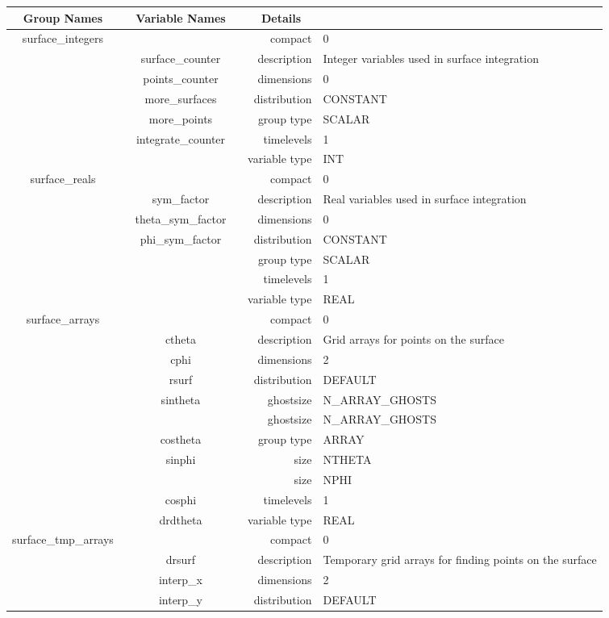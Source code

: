 \begin{tabular*}{150mm}{|c|c@{\extracolsep{\fill}}|rl|} \hline 
~ {\bf Group Names} ~ & ~ {\bf Variable Names} ~  &{\bf Details} ~ & ~ \\ 
\hline 
surface\_integers &  & compact & 0 \\ 
 & surface\_counter & description & Integer variables used in surface integration \\ 
 & points\_counter & dimensions & 0 \\ 
 & more\_surfaces & distribution & CONSTANT \\ 
 & more\_points & group type & SCALAR \\ 
 & integrate\_counter & timelevels & 1 \\ 
 &  & variable type & INT \\ 
\hline 
surface\_reals &  & compact & 0 \\ 
 & sym\_factor & description & Real variables used in surface integration \\ 
 & theta\_sym\_factor & dimensions & 0 \\ 
 & phi\_sym\_factor & distribution & CONSTANT \\ 
 &  & group type & SCALAR \\ 
 &  & timelevels & 1 \\ 
 &  & variable type & REAL \\ 
\hline 
surface\_arrays &  & compact & 0 \\ 
 & ctheta & description & Grid arrays for points on the surface \\ 
 & cphi & dimensions & 2 \\ 
 & rsurf & distribution & DEFAULT \\ 
 & sintheta & ghostsize & N\_ARRAY\_GHOSTS \\ 
& ~ & ghostsize & N\_ARRAY\_GHOSTS \\ 
 & costheta & group type & ARRAY \\ 
 & sinphi & size & NTHETA \\ 
& ~ & size & NPHI \\ 
 & cosphi & timelevels & 1 \\ 
 & drdtheta & variable type & REAL \\ 
\hline 
surface\_tmp\_arrays &  & compact & 0 \\ 
 & drsurf & description & Temporary grid arrays for finding points on the surface \\ 
 & interp\_x & dimensions & 2 \\ 
 & interp\_y & distribution & DEFAULT \\ 

\end{tabular*}
